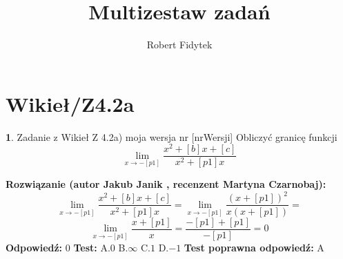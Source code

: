 \documentclass[12pt, a4paper]{article}
\title{Multizestaw zadań}
\author{Robert Fidytek}
\date{}
\theoremstyle{definition} %
\newtheorem{zad}{}
\newcommand{\kategoria}[1]{\section{#1}} %
\newcommand{\zadStart}[1]{\begin{zad}#1\newline} %
\newcommand{\zadStop}{\end{zad}}   %
\newcommand{\rozwStart}[2]{\noindent \textbf{Rozwiązanie (autor #1 , recenzent #2): }\newline} %
\newcommand{\rozwStop}{\newline}                                            %
\newcommand{\odpStart}{\noindent \textbf{Odpowiedź:}\newline}    %
\newcommand{\odpStop}{\newline}                                             %
\newcommand{\testStart}{\noindent \textbf{Test:}\newline} %
\newcommand{\testStop}{\newline} %
\newcommand{\kluczStart}{\noindent \textbf{Test poprawna odpowiedź:}\newline} %
\newcommand{\kluczStop}{\newline} %
\begin{document}
\maketitle


\kategoria{Wikieł/Z4.2a}
\zadStart{Zadanie z Wikieł Z 4.2a) moja wersja nr [nrWersji]}
Obliczyć granicę funkcji $$\lim_{x \to -[p1]} \frac{x^2 + [b]x + [c]}{x^2 + [p1]x}$$
\zadStop
\rozwStart{Jakub Janik}{Martyna Czarnobaj}
$$\lim_{x \to -[p1]} \frac{x^2 + [b]x + [c]}{x^2 + [p1]x} = \lim_{x \to -[p1]} \frac{(x+[p1])^2}{x(x+[p1])}=$$
$$\lim_{x \to -[p1]} \frac{x+[p1]}{x}=\frac{-[p1]+[p1]}{-[p1]}=0$$
\rozwStop
\odpStart
$0$
\odpStop
\testStart
A.$0$
B.$\infty$
C.$1$
D.$-1$
\testStop
\kluczStart
A
\kluczStop
\end{document}
